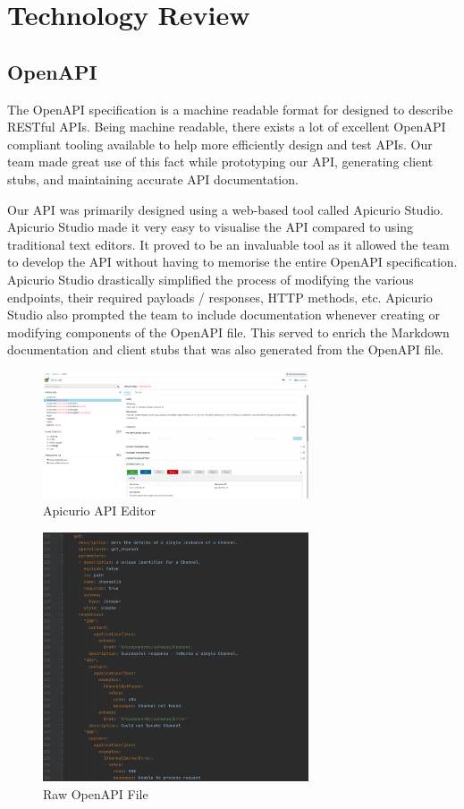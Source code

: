 \chapter{Technology Review}
\section{OpenAPI}
The OpenAPI specification is a machine readable format for designed to describe RESTful APIs. Being machine readable,
there exists a lot of excellent OpenAPI compliant tooling available to help more efficiently design and test APIs. Our
team made great use of this fact while prototyping our API, generating client stubs, and maintaining
accurate API documentation.

Our API was primarily designed using a web-based tool called Apicurio Studio. Apicurio Studio made it very easy to
visualise the API compared to using traditional text editors. It proved to be an invaluable tool as it allowed the team
to develop the API without having to memorise the entire OpenAPI specification. Apicurio Studio drastically simplified
the process of modifying the various endpoints, their required payloads / responses, HTTP methods, etc. Apicurio Studio
also prompted the team to include documentation whenever creating or modifying components of the OpenAPI file. This
served to enrich the Markdown documentation and client stubs that was also generated from the OpenAPI file.

\begin{figure}[h!]
    \centering
    \includegraphics[width=0.7\textwidth]{images/ApicurioStudio.png}
    \caption{Apicurio API Editor}
    \label{image:models}
\end{figure}

\begin{figure}[h!]
    \centering
    \includegraphics[width=0.7\textwidth]{images/OpenAPI.png}
    \caption{Raw OpenAPI File}
    \label{image:models}
\end{figure}


